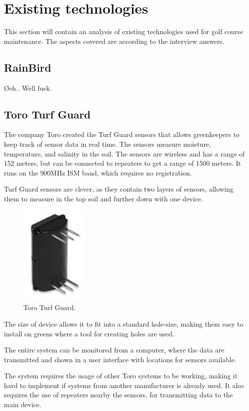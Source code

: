\section{Existing technologies}
This section will contain an analysis of existing technologies used for golf course maintenance. The aspects covered are according to the interview answers.

\subsection{RainBird}
Øeh.. Well fuck.

\subsection{Toro Turf Guard\texttrademark{}}
The company Toro created the Turf Guard\texttrademark{} sensors that allows greenkeepers to keep track of sensor data in real time. The sensors measure moisture, temperature, and salinity in the soil\cite{turfGuard}.
The sensors are wireless and has a range of 152 meters, but can be connected to repeaters to get a range of 1500 meters\cite{turfGuard}. It runs on the 900MHz ISM band, which requires no registration.

Turf Guard\texttrademark{} sensors are clever, as they contain two layers of sensors, allowing them to measure in the top soil and further down with one device.

\begin{figure}
\begin{center}
\includegraphics[width=0.3\textwidth]{chapters/analysis/figs/Turfguard.png}
\caption{Toro Turf Guard\texttrademark{}.}
\label{fig:arduinouno}
\end{center}
\end{figure}



The size of device allows it to fit into a standard hole-size, making them easy to install on greens where a tool for creating holes are used\cite{turfGuard2}.

The entire system can be monitored from a computer, where the data are transmitted and shown in a user interface with locations for sensors available\cite{turfGuard2}.

The system requires the usage of other Toro systems to be working, making it hard to implement if systems from another manufacturer is already used. It also requires the use of repeaters nearby the sensors, for transmitting data to the main device\cite{turfGuard2}.
